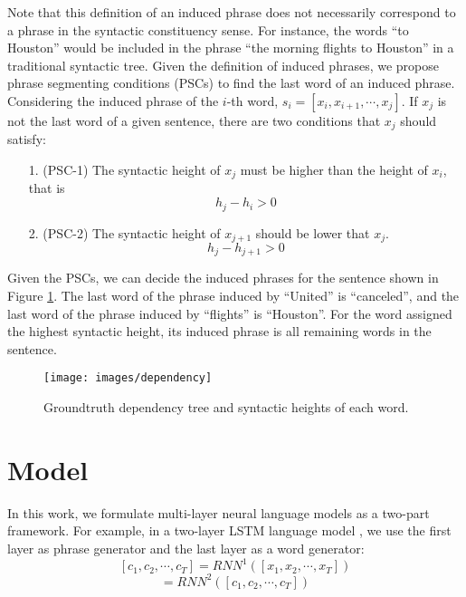 \documentclass[11pt,a4paper]{article}
\begin{document}
Note that this definition of an induced phrase does not necessarily correspond to a phrase in the syntactic constituency sense. For instance, the words ``to Houston'' would be included in the phrase ``the morning flights to Houston'' in a traditional syntactic tree. Given the definition of induced phrases, we propose phrase segmenting conditions (PSCs) to find the last word of an induced phrase. Considering the induced phrase of the $i$-th word, $s_i = [x_i, x_{i + 1}, \cdots, x_j]$. If $x_j$ is not the last word of a given sentence, there are two conditions that $x_j$ should satisfy:
\begin{itemize}
\item[1.] (PSC-1) The syntactic height of $x_j$ must be higher than the height of $x_i$, that is
\begin{equation}
h_j - h_i > 0
\end{equation}
\item[2.] (PSC-2) The syntactic height of $x_{j+1}$ should be lower that $x_j$.
\begin{equation}
h_j - h_{j+1} > 0
\end{equation}
\end{itemize}

Given the PSCs, we can decide the induced phrases for the sentence shown in Figure \ref{fig:dt}. The last word of the phrase induced by ``United'' is ``canceled'', and the last word of the phrase induced by ``flights'' is ``Houston''. For the word assigned the highest syntactic height, its induced phrase is all remaining words in the sentence.

\begin{figure}[t]
\centering
\texttt{[image: images/dependency]}
\caption{Groundtruth dependency tree and syntactic heights of each word.}
\label{fig:dt}
\end{figure}

\section{Model}
In this work, we formulate multi-layer neural language models as a two-part framework. For example, in a two-layer LSTM language model \cite{merity2017regularizing}, we use the first layer as phrase generator and the last layer as a word generator:
\begin{equation}
\label{eq:c}
[c_1, c_2, \cdots, c_T] = RNN^1 ([x_1, x_2, \cdots, x_T])
\end{equation}
\begin{equation}
[y_1, y_2, \cdots, y_T] = RNN^2 ([c_1, c_2, \cdots, c_T])
\end{equation}
\end{document}

